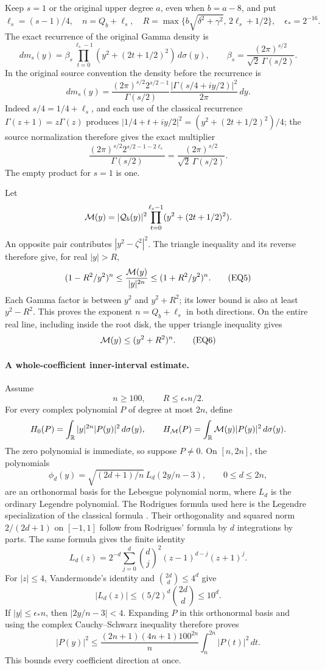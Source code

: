 \documentclass[11pt,a4paper]{article}
\begin{document}
Keep \(s=1\) or the original upper degree \(a\), even when \(b=a-8\), and
put
\[
 \ell_s=(s-1)/4,\quad n=Q_b+\ell_s,\quad
 R=\max\{b\sqrt{\delta^2+\gamma^2},\,2\ell_s+1/2\},\quad
 \epsilon_*=2^{-16}.
\]
The exact recurrence of the original Gamma density is
\[
 dm_s(y)=\beta_s\prod_{t=0}^{\ell_s-1}
      (y^2+(2t+1/2)^2)\,d\sigma(y),\qquad
 \beta_s=\frac{(2\pi)^{s/2}}{\sqrt2\,\Gamma(s/2)}.
\tag{EQ4}
\]
In the original source convention the density before the recurrence is
\[
 dm_s(y)=\frac{(2\pi)^{s/2}2^{s/2-1}}{\Gamma(s/2)}
       \frac{|\Gamma(s/4+iy/2)|^2}{2\pi}\,dy .
\]
Indeed \(s/4=1/4+\ell_s\), and each use of the classical recurrence
\(\Gamma(z+1)=z\Gamma(z)\)
\cite[eq.~(5.5.1)]{human:dlmf5} produces
\(|1/4+t+iy/2|^2=(y^2+(2t+1/2)^2)/4\); the source normalization
therefore gives the exact multiplier
\[
 \frac{(2\pi)^{s/2}2^{s/2-1-2\ell_s}}{\Gamma(s/2)}
 =\frac{(2\pi)^{s/2}}{\sqrt2\,\Gamma(s/2)}.
\]
The empty product for \(s=1\) is one.

Let
\[
 {\cal M}(y)=|{\cal Q}_b(y)|^2
       \prod_{t=0}^{\ell_s-1}(y^2+(2t+1/2)^2).
\]
An opposite pair contributes \(|y^2-\zeta^2|^2\).  The triangle
inequality and its reverse therefore give, for real \(|y|>R\),
\[
 (1-R^2/y^2)^n
 \le \frac{{\cal M}(y)}{|y|^{2n}}
 \le (1+R^2/y^2)^n.
\tag{EQ5}
\]
Each Gamma factor is between \(y^2\) and \(y^2+R^2\); its lower bound
is also at least \(y^2-R^2\).  This proves the exponent \(n=Q_b+\ell_s\)
in both directions.  On the entire real line, including inside the root
disk, the upper triangle inequality gives
\[
 {\cal M}(y)\le(y^2+R^2)^n.
\tag{EQ6}
\]

\paragraph{A whole-coefficient inner-interval estimate.}
Assume
\[
 n\ge100,\qquad R\le\epsilon_*n/2.
\tag{EQ7}
\]
For every complex polynomial \(P\) of degree at most \(2n\), define
\[
 H_0(P)=\int_{\mathbb R}|y|^{2n}|P(y)|^2\,d\sigma(y),\qquad
 H_{\cal M}(P)=\int_{\mathbb R}{\cal M}(y)|P(y)|^2\,d\sigma(y).
\]
The zero polynomial is immediate, so suppose \(P\ne0\).
On \([n,2n]\), the polynomials
\[
 \phi_d(y)=\sqrt{(2d+1)/n}\,L_d(2y/n-3),\qquad 0\le d\le2n,
\]
are an orthonormal basis for the Lebesgue polynomial norm, where \(L_d\)
is the ordinary Legendre polynomial.  The Rodrigues formula used here is
the Legendre specialization of the classical formula
\cite[eq.~(18.5.5) and Table~18.5.1]{human:dlmf18}.
Their orthogonality and squared
norm \(2/(2d+1)\) on \([-1,1]\) follow from Rodrigues' formula by \(d\)
integrations by parts.  The same formula gives the finite identity
\[
 L_d(z)=2^{-d}\sum_{j=0}^d
       \binom dj^2(z-1)^{d-j}(z+1)^j.
\]
For \(|z|\le4\), Vandermonde's identity and
\(\binom{2d}{d}\le4^d\) give
\[
 |L_d(z)|\le (5/2)^d\binom{2d}{d}\le10^d.
\]
If \(|y|\le\epsilon_*n\), then \(|2y/n-3|<4\).  Expanding \(P\) in
this orthonormal basis and using the complex Cauchy--Schwarz inequality
therefore proves
\[
 |P(y)|^2\le
 \frac{(2n+1)(4n+1)100^{2n}}{n}
       \int_n^{2n}|P(t)|^2\,dt .
\tag{EQ8}
\]
This bounds every coefficient direction at once.
\end{document}
